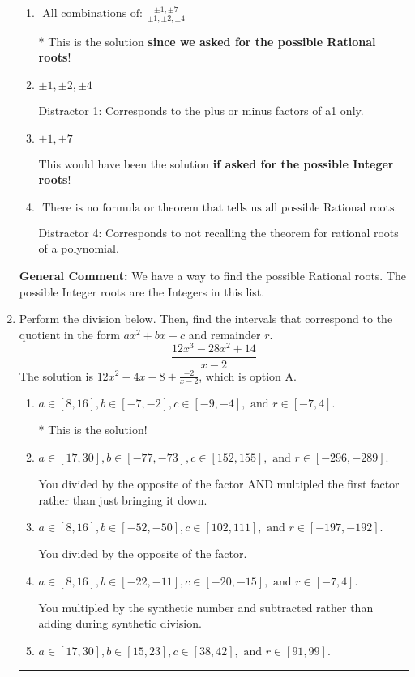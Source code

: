 \documentclass{extbook}[14pt]
\newcommand{\litem}[1]{\item #1

\rule{\textwidth}{0.4pt}}
\begin{document}
\begin{enumerate}
{\begin{enumerate}[label=\Alph*.]
 Distractor 3: Corresponds to the plus or minus of the inverse quotient (an/a0) of the factors. 
\item \( \text{ All combinations of: }\frac{\pm 1,\pm 7}{\pm 1,\pm 2,\pm 4} \)

* This is the solution \textbf{since we asked for the possible Rational roots}!
\item \( \pm 1,\pm 2,\pm 4 \)

 Distractor 1: Corresponds to the plus or minus factors of a1 only.
\item \( \pm 1,\pm 7 \)

This would have been the solution \textbf{if asked for the possible Integer roots}!
\item \( \text{ There is no formula or theorem that tells us all possible Rational roots.} \)

 Distractor 4: Corresponds to not recalling the theorem for rational roots of a polynomial.
\end{enumerate}

\textbf{General Comment:} We have a way to find the possible Rational roots. The possible Integer roots are the Integers in this list.
}
\litem{
Perform the division below. Then, find the intervals that correspond to the quotient in the form $ax^2+bx+c$ and remainder $r$.
\[ \frac{12x^{3} -28 x^{2} + 14}{x -2} \]The solution is \( 12x^{2} -4 x -8 + \frac{-2}{x -2} \), which is option A.\begin{enumerate}[label=\Alph*.]
\item \( a \in [8, 16], b \in [-7, -2], c \in [-9, -4], \text{ and } r \in [-7, 4]. \)

* This is the solution!
\item \( a \in [17, 30], b \in [-77, -73], c \in [152, 155], \text{ and } r \in [-296, -289]. \)

 You divided by the opposite of the factor AND multipled the first factor rather than just bringing it down.
\item \( a \in [8, 16], b \in [-52, -50], c \in [102, 111], \text{ and } r \in [-197, -192]. \)

 You divided by the opposite of the factor.
\item \( a \in [8, 16], b \in [-22, -11], c \in [-20, -15], \text{ and } r \in [-7, 4]. \)

 You multipled by the synthetic number and subtracted rather than adding during synthetic division.
\item \( a \in [17, 30], b \in [15, 23], c \in [38, 42], \text{ and } r \in [91, 99]. \)


\end{enumerate}}
\end{enumerate}
\end{document}
